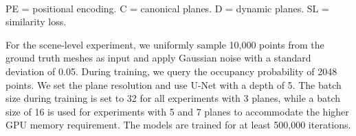 \documentclass[10pt,twocolumn,letterpaper]{article}
\begin{document}
\begin{table}[b!]
\centering
{}\\
\footnotesize{PE = positional encoding. C = canonical planes. D = dynamic planes. SL = similarity loss.}
\caption{\textbf{Scene-level reconstruction on synthetic rooms.} Our results on the synthetic indoor scene dataset.}

\label{tab:scene_result}
\end{table}

For the scene-level experiment, we uniformly sample 10,000 points from the ground truth meshes as input and apply Gaussian noise with a standard deviation of 0.05. During training, we query the occupancy probability of 2048 points. 
We set the plane resolution  and use U-Net with a depth of 5.
The batch size during training is set to 32 for all experiments with 3 planes, while
a batch size of 16 is used for experiments with 5 and 7 planes to accommodate the higher GPU memory requirement. The models are trained for at least 500,000 iterations. 
\end{document}
